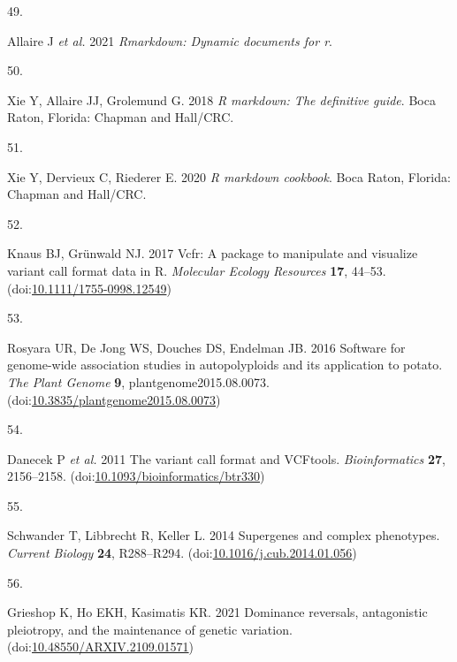 \documentclass[
  11pt,
  a4paper,
]{article}
\newlength{\cslhangindent}
\newlength{\csllabelwidth}
\newlength{\cslentryspacingunit} %
\newenvironment{CSLReferences}[2] %
 {%
  \setlength{\parindent}{0pt}
  \ifodd #1
  \let\oldpar\par
  \def\par{\hangindent=\cslhangindent\oldpar}
  \fi
  \setlength{\parskip}{#2\cslentryspacingunit}
 }%
 {}
\newcommand{\CSLLeftMargin}[1]{\parbox[t]{\csllabelwidth}{#1}}
\newcommand{\CSLRightInline}[1]{\parbox[t]{\linewidth - \csllabelwidth}{#1}\break}
\begin{document}
\begin{CSLReferences}{0}{0}
\leavevmode{}%
\CSLLeftMargin{49. }%
\CSLRightInline{Allaire J \emph{et al.} 2021 \emph{Rmarkdown: {Dynamic} documents for r}. }

\leavevmode{}%
\CSLLeftMargin{50. }%
\CSLRightInline{Xie Y, Allaire JJ, Grolemund G. 2018 \emph{R markdown: {The} definitive guide}. {Boca Raton, Florida}: {Chapman and Hall/CRC}. }

\leavevmode{}%
\CSLLeftMargin{51. }%
\CSLRightInline{Xie Y, Dervieux C, Riederer E. 2020 \emph{R markdown cookbook}. {Boca Raton, Florida}: {Chapman and Hall/CRC}. }

\leavevmode{}%
\CSLLeftMargin{52. }%
\CSLRightInline{Knaus BJ, Grünwald NJ. 2017 Vcfr: A package to manipulate and visualize variant call format data in {R}. \emph{Molecular Ecology Resources} \textbf{17}, 44--53. (doi:\href{https://doi.org/10.1111/1755-0998.12549}{10.1111/1755-0998.12549})}

\leavevmode{}%
\CSLLeftMargin{53. }%
\CSLRightInline{Rosyara UR, De Jong WS, Douches DS, Endelman JB. 2016 Software for genome-wide association studies in autopolyploids and its application to potato. \emph{The Plant Genome} \textbf{9}, plantgenome2015.08.0073. (doi:\href{https://doi.org/10.3835/plantgenome2015.08.0073}{10.3835/plantgenome2015.08.0073})}

\leavevmode{}%
\CSLLeftMargin{54. }%
\CSLRightInline{Danecek P \emph{et al.} 2011 The variant call format and {VCFtools}. \emph{Bioinformatics} \textbf{27}, 2156--2158. (doi:\href{https://doi.org/10.1093/bioinformatics/btr330}{10.1093/bioinformatics/btr330})}

\leavevmode{}%
\CSLLeftMargin{55. }%
\CSLRightInline{Schwander T, Libbrecht R, Keller L. 2014 Supergenes and complex phenotypes. \emph{Current Biology} \textbf{24}, R288--R294. (doi:\href{https://doi.org/10.1016/j.cub.2014.01.056}{10.1016/j.cub.2014.01.056})}

\leavevmode{}%
\CSLLeftMargin{56. }%
\CSLRightInline{Grieshop K, Ho EKH, Kasimatis KR. 2021 Dominance reversals, antagonistic pleiotropy, and the maintenance of genetic variation. (doi:\href{https://doi.org/10.48550/ARXIV.2109.01571}{10.48550/ARXIV.2109.01571})}


\end{CSLReferences}
\end{document}
